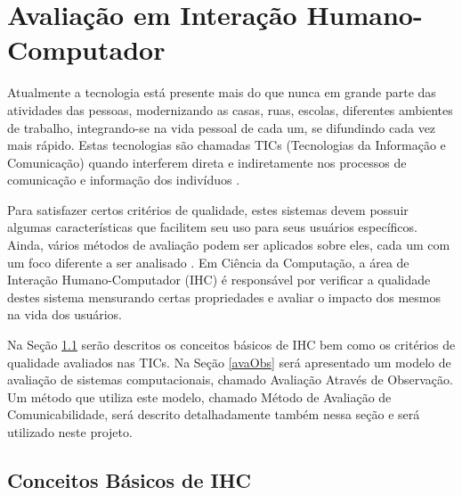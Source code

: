 \chapter{Avaliação em Interação Humano-Computador}

\indent Atualmente a tecnologia está presente mais do que nunca em grande parte das atividades das pessoas, modernizando as casas, ruas, escolas, diferentes ambientes de trabalho, integrando-se na vida pessoal de cada um, se difundindo cada vez mais rápido. Estas tecnologias são chamadas TICs (Tecnologias da Informação e Comunicação) quando interferem direta e indiretamente nos processos de comunicação e informação dos indivíduos \cite{tics}. 

\indent Para satisfazer certos critérios de qualidade, estes sistemas devem possuir algumas características que facilitem seu uso para seus usuários específicos. Ainda, vários métodos de avaliação podem ser aplicados sobre eles, cada um com um foco diferente a ser analisado \cite{IHCbook}. Em Ciência da Computação, a área de Interação Humano-Computador (IHC) é responsável por verificar a qualidade destes sistema mensurando certas propriedades e avaliar o impacto dos mesmos na vida dos usuários. 

\indent Na Seção \ref{cbIHC} serão descritos os conceitos básicos de IHC bem como os critérios de qualidade avaliados nas TICs. Na Seção \ref{avaObs} será apresentado um modelo de avaliação de sistemas computacionais, chamado Avaliação Através de Observação. Um método que utiliza este modelo, chamado Método de Avaliação de Comunicabilidade, será descrito detalhadamente também nessa seção e será utilizado neste projeto.
 
\section{Conceitos Básicos de IHC} \label{cbIHC}

